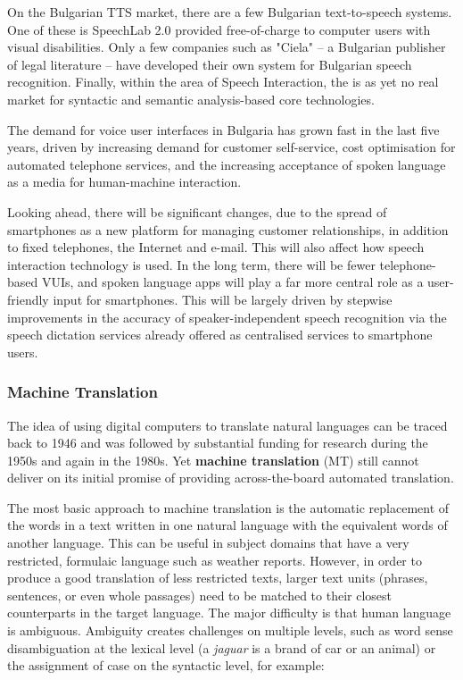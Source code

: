 \documentclass[]{../../metanetpaper}
\begin{document}
\begin{multicols}{2}
On the Bulgarian TTS market, there are a few Bulgarian text-to-speech systems. One of these is SpeechLab 2.0 provided free-of-charge to computer users with visual disabilities. Only a few companies such as "Ciela" – a Bulgarian publisher of legal literature -- have developed their own system for Bulgarian speech recognition. Finally, within the area of Speech Interaction, the is as yet no real market for syntactic and semantic analysis-based core technologies. 

The demand for voice user interfaces in Bulgaria has grown fast in the last five years, driven by increasing demand for customer self-service, cost optimisation for automated telephone services, and the increasing acceptance of spoken language as a media for human-machine interaction. 

Looking ahead, there will be significant changes, due to the spread of smartphones as a new platform for managing customer relationships, in addition to fixed telephones, the Internet and e-mail. This will also affect how speech interaction technology is used. In the long term, there will be fewer telephone-based VUIs, and spoken language apps will play a far more central role as a user-friendly input for smartphones. This will be largely driven by stepwise improvements in the accuracy of speaker-independent speech recognition via the speech dictation services already offered as centralised services to smartphone users.

\subsubsection{Machine Translation}

The idea of using digital computers to translate natural languages can be traced back to 1946 and was followed by substantial funding for research during the 1950s and again in the 1980s. Yet \textbf{machine translation} (MT) still cannot deliver on its initial promise of providing across-the-board automated translation.


The most basic approach to machine translation is the automatic replacement of the words in a text written in one natural language with the equivalent words of another language. This can be useful in subject domains that have a very restricted, formulaic language such as weather reports.  However, in order to produce a good translation of less restricted texts, larger text units (phrases, sentences, or even whole passages) need to be matched to their closest counterparts in the target language. The major difficulty is that human language is ambiguous. Ambiguity creates challenges on multiple levels, such as word sense disambiguation at the lexical level (a \textit{jaguar} is a brand of car or an animal) or the assignment of case on the syntactic level, for example:


\end{multicols}
\end{document}
